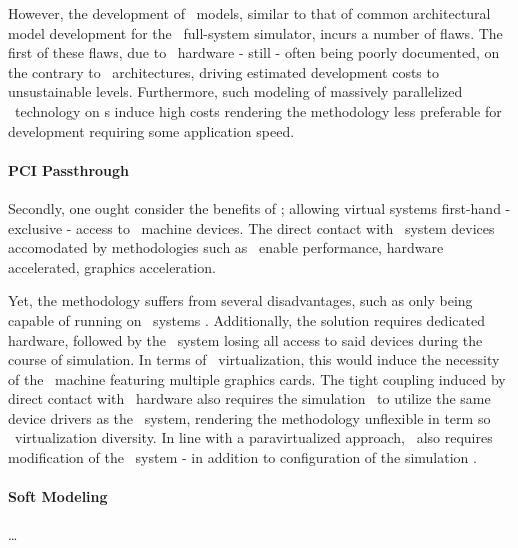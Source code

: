However, the development of \dvttermgpu\ models, similar to that of common architectural model development for the \dvttermsimics\ full-system simulator, incurs a number of flaws.
The first of these flaws, due to \dvttermgpu\ hardware - still - often being poorly documented, on the contrary to \dvttermcpu\ architectures, driving estimated development costs to unsustainable levels.
Furthermore, such modeling of massively parallelized \dvttermgpu\ technology on \dvttermcpu s induce high costs rendering the methodology less preferable for development requiring some application speed.

\paragraph{PCI Passthrough}
\label{par:analysis_pcipassthrough}
Secondly, one ought consider the benefits of \dvttermpcipassthrough ; allowing virtual systems first-hand - exclusive - access to \dvttermhost\ machine devices.
The direct contact with \dvttermhost\ system devices accomodated by methodologies such as \dvttermpcipassthrough\ enable performance, hardware accelerated, graphics acceleration.

Yet, the methodology suffers from several disadvantages, such as only being capable of running on \dvttermlinux\ systems .
Additionally, the solution requires dedicated hardware, followed by the \dvttermhost\ system losing all access to said devices during the course of simulation.
In terms of \dvttermgpu\ virtualization, this would induce the necessity of the \dvttermhost\ machine featuring multiple graphics cards.
The tight coupling induced by direct contact with \dvttermhost\ hardware also requires the simulation \dvttermtarget\ to utilize the same device drivers as the \dvttermhost\ system, rendering the methodology unflexible in term so \dvttermgpu\ virtualization diversity.
In line with a paravirtualized approach, \dvttermpcipassthrough\ also requires modification of the \dvttermtarget\ system - in addition to configuration of the simulation \dvttermhost .


\paragraph{Soft Modeling}
\label{par:analysis_softmodeling}
\ldots


